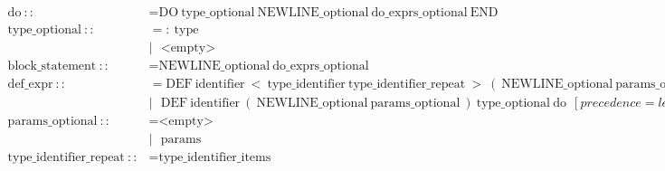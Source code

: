 \documentclass{article}
\begin{document}
\begin{align*}
  \text{do}\ ::                       & = \text{DO}\ \text{type\_optional}\ \text{NEWLINE\_optional}\ \text{do\_exprs\_optional}\ \text{END}                                                                                                                      \\
  \text{type\_optional}\ ::           & = :\ \text{type}                                                                                                                                                                                                          \\
                                      & |\ \ \ \text{<empty>}                                                                                                                                                                                                     \\
  \text{block\_statement}\ ::         & = \text{NEWLINE\_optional}\ \text{do\_exprs\_optional}                                                                                                                                                                    \\
  \text{def\_expr}\ ::                & = \text{DEF}\ \text{identifier}\ <\ \text{type\_identifier}\ \text{type\_identifier\_repeat}\ >\ (\ \text{NEWLINE\_optional}\ \text{params\_optional}\ )\ \text{type\_optional}\ \text{do}\ \ [precedence=left,\ level=7] \\
                                      & |\ \ \ \text{DEF}\ \text{identifier}\ (\ \text{NEWLINE\_optional}\ \text{params\_optional}\ )\ \text{type\_optional}\ \text{do}\ \ [precedence=left,\ level=7]                                                            \\
  \text{params\_optional}\ ::         & = \text{<empty>}                                                                                                                                                                                                          \\
                                      & |\ \ \ \text{params}                                                                                                                                                                                                      \\
  \text{type\_identifier\_repeat}\ :: & = \text{type\_identifier\_items}                                                                                                                                                                                          \\

\end{align*}
\end{document}
